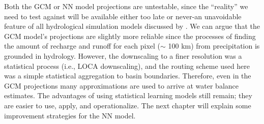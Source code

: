 Both the GCM or NN model projections are untestable, since the ``reality'' we need to test against will be available either too late or never-an unavoidable feature of all hydrological simulation models discussed by . We can argue that the GCM model's projections are slightly more reliable since the processes of finding the amount of recharge and runoff for each pixel ($\sim$ 100 km) from precipitation is grounded in hydrology. However, the downscaling to a finer resolution was a statistical process (i.e., LOCA downscaling), and the routing scheme used here was a simple statistical aggregation to basin boundaries. Therefore, even in the GCM projections many approximations are used to arrive at water balance estimates. The advantages of using statistical learning models still remain; they are easier to use, apply, and operationalize. The next chapter will explain some improvement strategies for the NN model. 

